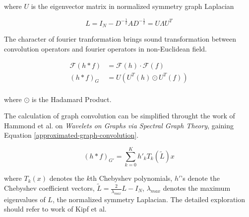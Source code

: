where $U$ is the eigenvector matrix in normalized symmetry graph Laplacian

\begin{equation}
    L = I_N - D^{-\frac{1}{2}}AD^{-\frac{1}{2}} = U\Lambda U^T
    \label{normalized-sysmetry-graph-laplacian}
\end{equation}

The character of fourier tranformation brings sound transformation between convolution operators and fourier operators in non-Euclidean field. 

\begin{equation}
    \begin{aligned}
        \mathcal{F} (h \ast f) & = \mathcal{F} (h) \cdot \mathcal{F} (f) \\
        (h \ast f)_G & = U\left(U^T(h)\odot U^T(f)\right) \\
    \end{aligned}
    \label{graph-convolution}
\end{equation}

where $\odot$ is the Hadamard Product. 

The calculation of graph convolution can be simplified throught the work of Hammond et al. on \textit{Wavelets on Graphs via Spectral Graph Theory}\cite{Hammond2009WaveletsOG}, gaining Equation \ref{approximated-graph-convolution}.

\begin{equation}
    (h \ast f)_{G'} = \sum _ {k=0} ^ K h' _ k T _ k (\tilde{L}) x
    \label{approximated-graph-convolution}
\end{equation}

where $T_k (x)$ denotes the $k$th Chebyshev polynomials, $h'$'s denote the Chebyshev coefficient vectors, $\tilde{L} = \frac{2}{\lambda_{max}}L - I_N$, $\lambda_{max}$ denotes the maximum eigenvalues of $L$, the normalized symmetry Laplacian. The detailed exploration should refer to work of Kipf et al.\cite{DBLP:journals/corr/KipfW16}
